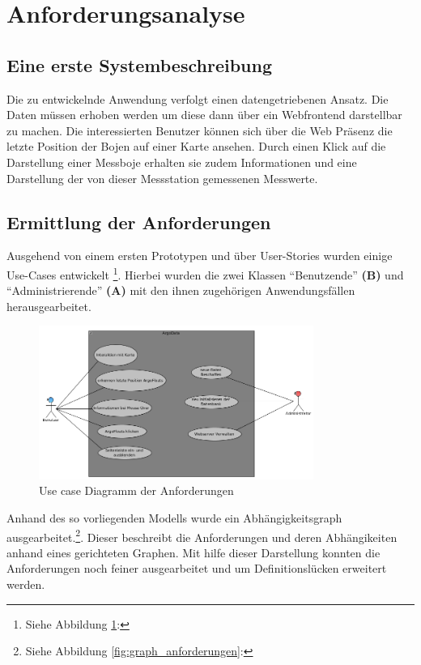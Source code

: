 \section{Anforderungsanalyse}

\subsection{Eine erste Systembeschreibung}

    Die zu entwickelnde Anwendung verfolgt einen datengetriebenen Ansatz. Die Daten müssen erhoben werden um diese dann über ein Webfrontend darstellbar zu machen.  Die interessierten Benutzer  können sich über die Web Präsenz die letzte Position der Bojen auf einer Karte ansehen. Durch einen Klick auf die Darstellung einer Messboje erhalten sie zudem Informationen und eine Darstellung der von dieser Messstation gemessenen Messwerte.
    
    

    \subsection{Ermittlung der Anforderungen}
    
    Ausgehend von einem ersten Prototypen  und über User-Stories wurden einige Use-Cases entwickelt \footnote{Siehe Abbildung \ref{fig:use_case}: }.  Hierbei wurden die zwei Klassen "`Benutzende"' \textbf{(B)} und "`Administrierende"'  \textbf{(A)} mit den ihnen zugehörigen Anwendungsfällen herausgearbeitet. 
    
    \begin{figure}[h!]
        \centering
        \includegraphics[width=0.8\textwidth]{pix/use-case.png}
        \caption{Use case Diagramm der Anforderungen}
        \label{fig:use_case}
    \end{figure}
    
    Anhand des so vorliegenden Modells wurde ein Abhängigkeitsgraph ausgearbeitet.\footnote{Siehe Abbildung \ref{fig:graph_anforderungen}: }.  Dieser beschreibt die Anforderungen und deren Abhängikeiten anhand eines gerichteten Graphen. Mit hilfe dieser Darstellung konnten die Anforderungen noch feiner ausgearbeitet und um Definitionslücken erweitert werden.  
    
